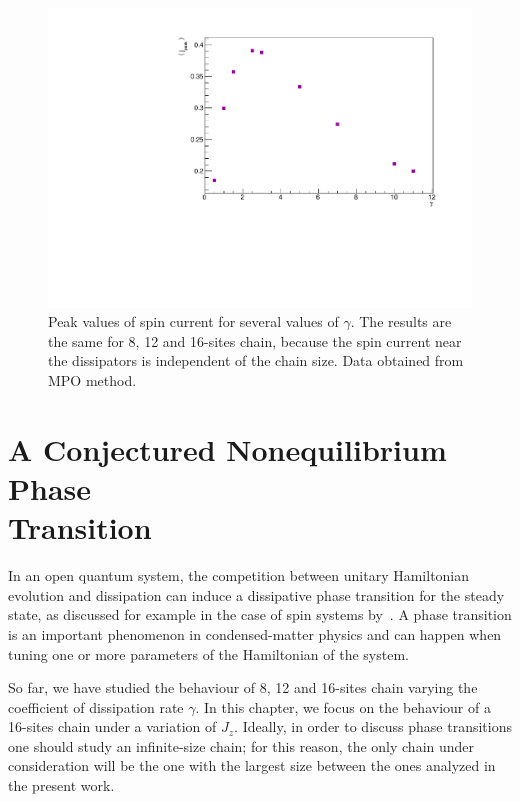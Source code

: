 \begin{figure}[H]
    \centering
    \includegraphics[scale=0.7]{Figures/PeakValueSpinCurrVSgamma_8sites.pdf}
    \captionsetup{width=1.\linewidth}
    \caption{Peak values of spin current for several values of $\gamma$. The results are the same for 8, 12 and 16-sites chain, because the spin current near the dissipators is independent of the chain size. Data obtained from MPO method.}
    \label{fig:PeakValueSpinCurrVSgamma_8sites}
\end{figure}


\section[A Conjectured Nonequilibrium Phase Transition]{A Conjectured Nonequilibrium Phase \\Transition}
\label{chapt4_phase_trans}

In an open quantum system, the competition between unitary Hamiltonian evolution and dissipation can induce a dissipative phase transition for the steady state, as discussed for example in the case of spin systems by~\cite{phase_trans_spin_system}.
A phase transition is an important phenomenon in condensed-matter physics and can happen when tuning one or more parameters of the Hamiltonian of the system. 

So far, we have studied the behaviour of 8, 12 and 16-sites chain varying the coefficient of dissipation rate $\gamma$. In this chapter, we focus on the behaviour of a 16-sites chain under a variation of $J_z$. Ideally, in order to discuss phase transitions one should study an infinite-size chain; for this reason, the only chain under consideration will be the one with the largest size between the ones analyzed in the present work. 


